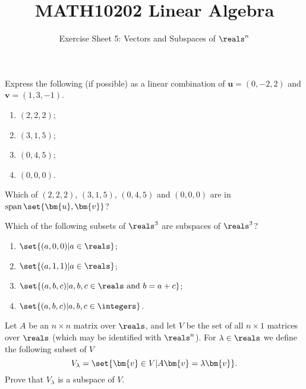 \documentclass[english,12pt,a4paper]{scrartcl}
\title{MATH10202 Linear Algebra}
\subtitle{Exercise Sheet 5: Vectors and Subspaces of $\reals^n$}
\author{}
\date{\vspace{-5ex}}
\renewcommand{\vec}[1]{\bm{#1}}
\newenvironment{modenumerate}
  {\enumerate\setupmodenumerate}
  {\endenumerate}
\newif\ifmoditem
\newcommand{\setupmodenumerate}{%
  \global\moditemfalse
  \let\origmakelabel\makelabel
  \def\moditem##1{\global\moditemtrue\def\mesymbol{##1}\item}%
  \def\makelabel##1{%
  \origmakelabel{##1\ifmoditem\rlap{\mesymbol}\fi\enspace}%
\global\moditemfalse}%
}
\DeclareMathOperator{\spn}{span}
\newcommand\spanset[1]{\ensuremath{\spn\set{#1}}}
\begin{document}
\maketitle

\begin{modenumerate}
  \moditem{*} Express the following (if possible) as a linear combination of 
  $\vec{u} = (0, -2, 2)$ and $\vec{v} = (1, 3, -1)$.
  \begin{multicols}{4}
    \begin{enumerate}
      \item $(2, 2, 2)$;
      \item $(3, 1, 5)$;
      \item $(0, 4, 5)$;
      \item $(0, 0, 0)$.
    \end{enumerate}
  \end{multicols}
  Which of $(2, 2, 2)$, $(3, 1, 5)$, $(0, 4, 5)$ and $(0, 0, 0)$ are in 
  $\spanset{\vec{u}, \vec{v}}$?
  \moditem{*} Which of the following subsets of $\reals^3$ are subspaces of 
  $\reals^3$?
  \begin{multicols}{2}
    \begin{enumerate}
      \item $\set{(a, 0, 0) | a \in \reals}$;
      \item $\set{(a, 1, 1) | a \in \reals}$;
      \item $\set{(a, b, c) | a, b, c \in \reals \text{ and } b = a + c}$;
      \item $\set{(a, b, c) | a, b, c \in \integers}$.
    \end{enumerate}
  \end{multicols}
  \moditem{*} Let $A$ be an $n \times n$ matrix over $\reals$, and let $V$ be 
  the set of all $n \times 1$ matrices over $\reals$ (which may be identified 
  with $\reals^n$). For $\lambda \in \reals$ we define the following subset of 
  $V$
  \[
    V_\lambda = \set{\vec{v} \in V | A\vec{v} = \lambda \vec{v}}.
  \]
  Prove that $V_\lambda$ is a subspace of $V$.
  

\end{modenumerate}
\end{document}
